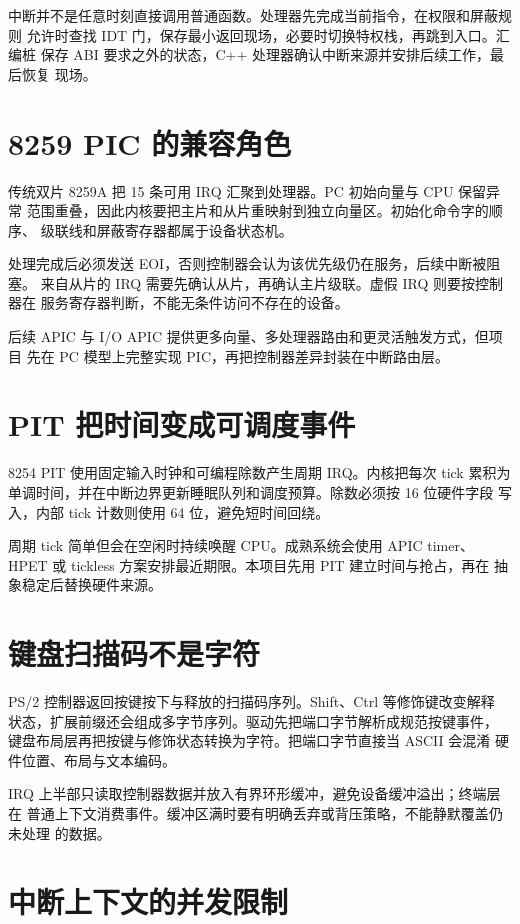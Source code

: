 中断并不是任意时刻直接调用普通函数。处理器先完成当前指令，在权限和屏蔽规则
允许时查找 IDT 门，保存最小返回现场，必要时切换特权栈，再跳到入口。汇编桩
保存 ABI 要求之外的状态，C++ 处理器确认中断来源并安排后续工作，最后恢复
现场。

\section{8259 PIC 的兼容角色}

传统双片 8259A 把 15 条可用 IRQ 汇聚到处理器。PC 初始向量与 CPU 保留异常
范围重叠，因此内核要把主片和从片重映射到独立向量区。初始化命令字的顺序、
级联线和屏蔽寄存器都属于设备状态机。

处理完成后必须发送 EOI，否则控制器会认为该优先级仍在服务，后续中断被阻塞。
来自从片的 IRQ 需要先确认从片，再确认主片级联。虚假 IRQ 则要按控制器在
服务寄存器判断，不能无条件访问不存在的设备。

后续 APIC 与 I/O APIC 提供更多向量、多处理器路由和更灵活触发方式，但项目
先在 PC 模型上完整实现 PIC，再把控制器差异封装在中断路由层。

\section{PIT 把时间变成可调度事件}

8254 PIT 使用固定输入时钟和可编程除数产生周期 IRQ。内核把每次 tick 累积为
单调时间，并在中断边界更新睡眠队列和调度预算。除数必须按 16 位硬件字段
写入，内部 tick 计数则使用 64 位，避免短时间回绕。

周期 tick 简单但会在空闲时持续唤醒 CPU。成熟系统会使用 APIC timer、
HPET 或 tickless 方案安排最近期限。本项目先用 PIT 建立时间与抢占，再在
抽象稳定后替换硬件来源。

\section{键盘扫描码不是字符}

PS/2 控制器返回按键按下与释放的扫描码序列。Shift、Ctrl 等修饰键改变解释
状态，扩展前缀还会组成多字节序列。驱动先把端口字节解析成规范按键事件，
键盘布局层再把按键与修饰状态转换为字符。把端口字节直接当 ASCII 会混淆
硬件位置、布局与文本编码。

IRQ 上半部只读取控制器数据并放入有界环形缓冲，避免设备缓冲溢出；终端层在
普通上下文消费事件。缓冲区满时要有明确丢弃或背压策略，不能静默覆盖仍未处理
的数据。

\section{中断上下文的并发限制}

